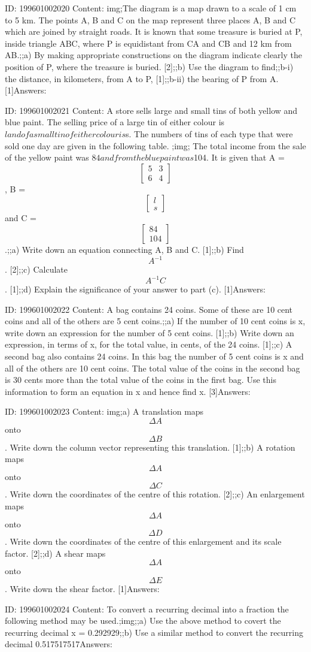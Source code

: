 \documentclass{article}
\begin{document}
ID: 199601002020
Content:
img;The diagram is a map drawn to a scale of 1 cm to 5 km. The points A, B and C on the map represent three places A, B and C which are joined by straight roads. It is known that some treasure is buried at P, inside triangle ABC, where P is equidistant from CA and CB and 12 km from AB.;;a) By making appropriate constructions on the diagram indicate clearly the position of P, where the treasure is buried. [2];;b) Use the diagram to find;;b-i) the distance, in kilometers, from A to P, [1];;b-ii) the bearing of P from A. [1]Answers:

ID: 199601002021
Content:
A store sells large and small tins of both yellow and blue paint. The selling price of a large tin of either colour is $l and of a small tin of either colour is $s. The numbers of tins of each type that were sold one day are given in the following table. ;img; The total income from the sale of the yellow paint was $84 and from the blue paint was $104. It is given that A = $$\begin{bmatrix}5&3\\6&4\end{bmatrix}$$, B = $$\begin{bmatrix}l\\s\end{bmatrix}$$  and C = $$\begin{bmatrix}84\\104\end{bmatrix}$$.;;a) Write down an equation connecting A, B and C. [1];;b) Find $$A^{-1}$$. [2];;c) Calculate $$A^{-1} C$$. [1];;d) Explain the significance of your answer to part (c). [1]Answers:

ID: 199601002022
Content:
A bag contains 24 coins. Some of these are 10 cent coins and all of the others are 5 cent coins.;;a) If the number of 10 cent coins is x, write down an expression for the number of 5 cent coins. [1];;b) Write down an expression, in terms of x, for the total value, in cents, of the 24 coins. [1];;c) A second bag also contains 24 coins. In this bag the number of 5 cent coins is x and all of the others are 10 cent coins. The total value of the coins in the second bag is 30 cents more than the total value of the coins in the first bag. Use this information to form an equation in x and hence find x. [3]Answers:

ID: 199601002023
Content:
img;a) A translation maps $$\Delta  A$$ onto $$\Delta  B$$. Write down the column vector representing this translation. [1];;b) A rotation maps $$\Delta  A$$ onto $$\Delta  C$$. Write down the coordinates of the centre of this rotation. [2];;c) An enlargement maps $$\Delta  A$$ onto $$\Delta  D$$. Write down the coordinates of the centre of this enlargement and its scale factor. [2];;d) A shear maps $$\Delta  A$$ onto $$\Delta  E$$. Write down the shear factor. [1]Answers:

ID: 199601002024
Content:
To convert a recurring decimal into a fraction the following method may be used.;img;;a) Use the above method to covert the recurring decimal x = 0.292929;;b) Use a similar method to convert the recurring decimal 0.517517517Answers:
\end{document}
